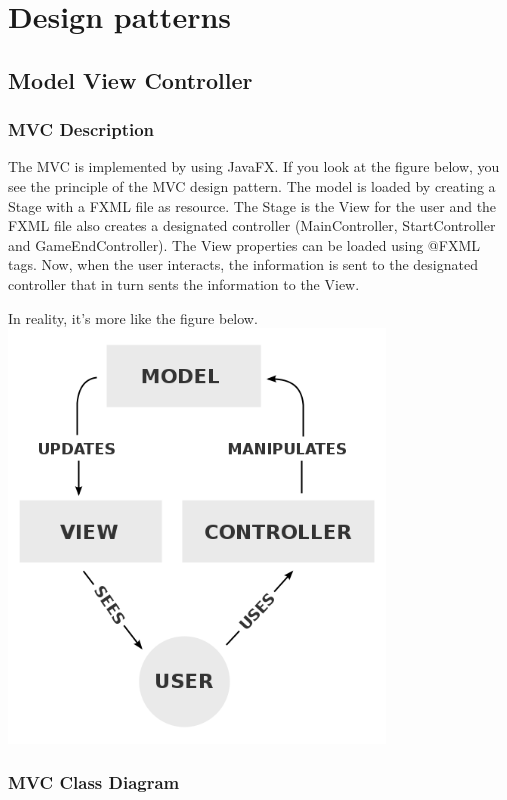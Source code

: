 \chapter{Design patterns}

\section{Model View Controller}

\subsection{MVC Description}
The MVC is implemented by using JavaFX. If you look at the figure below, you see the principle of the MVC design pattern. The model is loaded by creating a Stage with a FXML file as resource. The Stage is the View for the user and the FXML file also creates a designated controller (MainController, StartController and GameEndController). The View properties can be loaded using @FXML tags. Now, when the user interacts, the information is sent to the designated controller that in turn sents the information to the View. 

In reality, it's more like the figure below.
\\
\includegraphics[width=100mm]{MVC.png}

\subsection{MVC Class Diagram}

